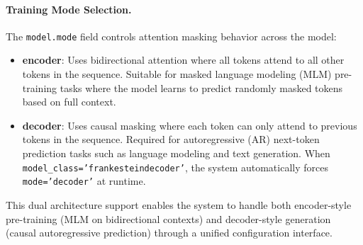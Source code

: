 \paragraph{Training Mode Selection.}
The \texttt{model.mode} field controls attention masking behavior across the model:
\begin{itemize}[leftmargin=*]
    \item \textbf{encoder}: Uses bidirectional attention where all tokens attend to all other tokens in the sequence. Suitable for masked language modeling (MLM) pre-training tasks where the model learns to predict randomly masked tokens based on full context.
    \item \textbf{decoder}: Uses causal masking where each token can only attend to previous tokens in the sequence. Required for autoregressive (AR) next-token prediction tasks such as language modeling and text generation. When \texttt{model\_class='frankesteindecoder'}, the system automatically forces \texttt{mode='decoder'} at runtime.
\end{itemize}

This dual architecture support enables the system to handle both encoder-style pre-training (MLM on bidirectional contexts) and decoder-style generation (causal autoregressive prediction) through a unified configuration interface.


